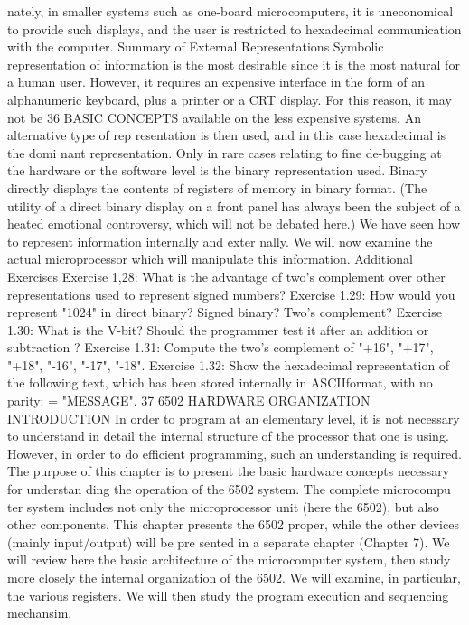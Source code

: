 nately, in smaller systems such as one-board microcomputers, it is
uneconomical to provide such displays, and the user is restricted
to hexadecimal communication with the computer.
Summary of External Representations
Symbolic representation of information is the most desirable
since it is the most natural for a human user. However, it requires
an expensive interface in the form of an alphanumeric keyboard,
plus a printer or a CRT display. For this reason, it may not be
36
BASIC CONCEPTS
available on the less expensive systems. An alternative type of rep
resentation is then used, and in this case hexadecimal is the domi
nant representation. Only in rare cases relating to fine de-bugging
at the hardware or the software level is the binary representation
used. Binary directly displays the contents of registers of memory
in binary format.
(The utility of a direct binary display on a front panel has always
been the subject of a heated emotional controversy, which will not
be debated here.)
We have seen how to represent information internally and exter
nally. We will now examine the actual microprocessor which will
manipulate this information.
Additional Exercises
Exercise 1,28: What is the advantage of two's complement over other
representations used to represent signed numbers?
Exercise 1.29: How would you represent "1024" in direct binary? Signed
binary? Two's complement?
Exercise 1.30: What is the V-bit? Should the programmer test it after an
addition or subtraction ?
Exercise 1.31: Compute the two's complement of "+16", "+17",
"+18", "-16", "-17", "-18".
Exercise 1.32: Show the hexadecimal representation of the following
text, which has been stored internally in ASCIIformat, with no parity:
= "MESSAGE".
37
6502 HARDWARE ORGANIZATION
INTRODUCTION
In order to program at an elementary level, it is not necessary
to understand in detail the internal structure of the processor
that one is using. However, in order to do efficient programming,
such an understanding is required. The purpose of this chapter is
to present the basic hardware concepts necessary for understan
ding the operation of the 6502 system. The complete microcompu
ter system includes not only the microprocessor unit (here the
6502), but also other components. This chapter presents the 6502
proper, while the other devices (mainly input/output) will be pre
sented in a separate chapter (Chapter 7).
We will review here the basic architecture of the microcomputer
system, then study more closely the internal organization of the
6502. We will examine, in particular, the various registers. We will
then study the program execution and sequencing mechansim.
